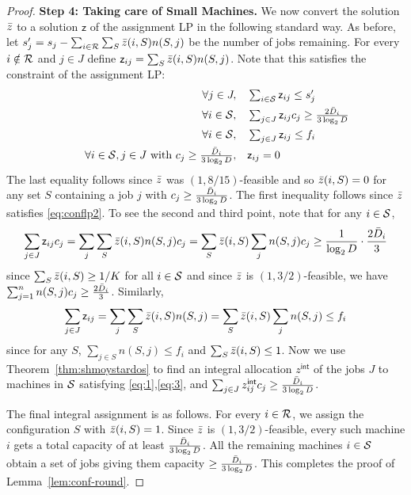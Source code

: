 \begin{proof}
\noindent
{\bf Step 4: Taking care of Small Machines.} 
\def\zz{z^{\mathsf{int}}}
\def\2z{\mathsf z}
We now convert the solution $\bar z$  to a solution $\2z$ of the assignment LP in the following standard way.
As before, let $s'_j = s_j - \sum_{i\in {\cal R}}\sum_S \bar z(i,S)n(S,j)$ be the number of jobs remaining.
For every $i\notin {\cal R}$ and $j\in J$ define $\2z_{ij} = \sum_{S}\z(i,S)n(S,j)$.  Note that this satisfies the constraint of the assignment LP:
	\begin{alignat}{4}
		&& \quad \forall j \in J,   &\quad  \textstyle \sum_{i\in \calS} \2z_{ij}  \leq  s'_j \label{eq:1} \\
		&& \quad \forall i\in \calS ,      &\quad  \textstyle \sum_{j\in J}  \2z_{ij}c_j \geq \frac{2\barD_i}{3\log_2 D} \label{eq:2} \\
	&& \quad \forall i\in \calS ,      &\quad  \textstyle \sum_{j\in J}  \2z_{ij} \leq f_i \label{eq:3} \\ 
		&& \quad \forall i\in \calS, j\in J~\textrm{with}~ \textstyle c_j \geq \frac{\barD_i}{3\log_2 D}, & \quad \2z_{ij}   =  0  \label{eq:4} 
	\end{alignat}
	The last equality follows since $\bar z$ was $(1,8/15)$-feasible and so $\bar z(i,S) = 0$ for any set $S$ containing a job $j$ with $c_j \geq \frac{\bar{D}_i}{3\log_2 D}$.
The first inequality follows  since $\bar z$ satisfies \eqref{eq:conflp2}. To see the second and third point, note 
that for any $i\in {\cal S}$,
\[
\sum_{j\in J} \2z_{ij}c_j = \sum_j \sum_S \z(i,S)n(S,j)c_j = \sum_S \z(i,S) \sum_j n(S,j)c_j \geq \frac{1}{\log_2 D}\cdot \frac{2\barD_i}{3}
\]
	since $\sum_S \bar z(i,S) \geq 1/K$ for all $i\in {\cal S}$ and since $\bar z$ is $(1,3/2)$-feasible, we have $\sum_{j=1}^n n(S,j) c_j \geq \frac{2\bar{D}_i}{3}$. Similarly,
\[
\sum_{j\in J} \2z_{ij} = \sum_j \sum_S \z(i,S)n(S,j) = \sum_S \z(i,S) \sum_j n(S,j) \leq f_i
\]
since for any $S$, $\sum_{j\in S} n(S,j) \leq f_i$ and $\sum_S \bar z(i,S) \leq 1$.
Now we use Theorem~\ref{thm:shmoystardos} to find an integral allocation $\zz$ of the jobs $J$ to machines in ${\cal S}$ satisfying \eqref{eq:1},\eqref{eq:3}, and $\sum_{j\in J} \zz_{ij}c_j \geq \frac{\barD_i}{3
\log_2 D}$. \medskip

The final integral assignment is as follows. For every $i\in {\cal R}$, we assign the configuration $S$ with $\bar z(i,S) = 1$.
Since $\bar z$ is $(1,3/2)$-feasible, every such machine $i$ gets a total capacity of at least $\frac{\bar{D}_i}{3\log_2 D}$. %
All the remaining machines $i\in {\cal S}$ obtain a set of jobs giving them capacity $\geq \frac{\bar{D}_i}{3\log_2 D}$. %
This completes the proof of Lemma~\ref{lem:conf-round}.
\end{proof}


